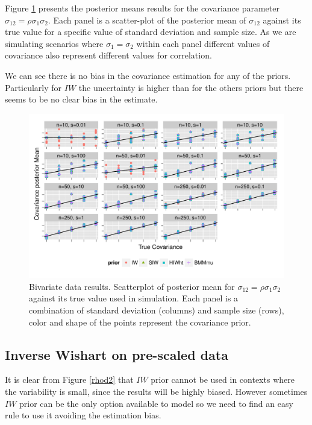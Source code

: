 \documentclass[a4paper]{article}
\newcommand{\matt}[1]{\textcolor{red}{(matt: #1)}}
\begin{document}
Figure \ref{devCov} presents the posterior means results for the covariance parameter $\sigma_{12}=\rho\sigma_1\sigma_2$. Each panel is a scatter-plot of the posterior mean of $\sigma_{12}$ against its true value for a specific value of standard deviation and sample size. As we are simulating scenarios where $\sigma_1 = \sigma_2$ within each panel different values of covariance also represent different values for correlation. 

We can see there is no bias in the covariance estimation for any of the priors. Particularly for $IW$ the uncertainty is higher than for the others priors but there seems to be no clear bias in the estimate. 
\begin{figure}[htbp]
   \centering
   \includegraphics[width=\textwidth]{fig_cov_d2} 
    \vspace{-.5in}
   \caption{Bivariate data results. Scatterplot of posterior mean for $\sigma_{12}=\rho\sigma_1\sigma_2$  against its true value used in simulation. Each panel is a combination of standard deviation (columns) and sample size (rows),  color and shape of the points represent the covariance prior. \label{devCov} %
}
\end{figure}

\subsection{Inverse Wishart on pre-scaled data}

It is clear from Figure \ref{rhod2} that $IW$ prior cannot be used in contexts where the variability is small, since the results will be highly biased. However sometimes $IW$ prior can be the only option available to model so we need to find an easy rule to use it avoiding the estimation bias. 
\end{document}
